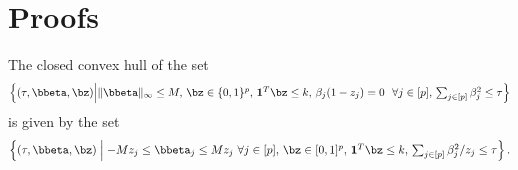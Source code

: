 \section{Proofs}
\label{appendix_sec:proofs}

\begin{namedlemma}
    [~\ref{lemma:equivalence_between_perspective_relaxation_and_convexification}]
    The closed convex hull of the set
    \begin{align*}
        \textstyle \left\{ (\tau, \bbeta, \bz) \middle|
        \| \bbeta \|_\infty \leq M, \, \bz \in \{0, 1\}^p, \, \mathbf{1}^T \bz \leq k, \, \beta_j ( 1 - z_j) = 0 ~~ \forall j \in [p], \, \sum_{j \in [p]} \beta_j^2 \leq \tau \right\}
    \end{align*}
    is given by the set
    \begin{align*}
        \textstyle \left\{ (\tau, \bbeta, \bz)  \;\middle|\; -M z_j\leq \bbeta_j \leq M z_j ~ \forall j \in [p], \, \bz \in [0, 1]^p, \, \mathbf{1}^T \bz \leq k, \, \sum_{j \in [p]} \beta_j^2 / z_j \leq \tau \right\}.
    \end{align*}
\end{namedlemma}

